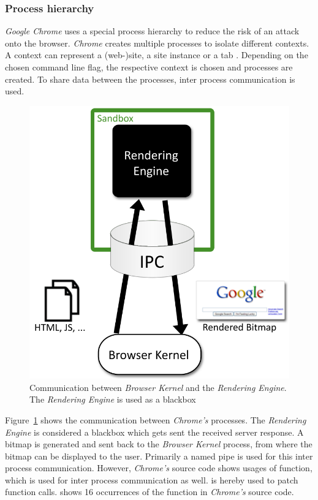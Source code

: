\subsubsection{Process hierarchy}
\emph{Google Chrome} uses a special process hierarchy to reduce the risk of an attack onto the browser. \emph{Chrome} creates multiple processes to isolate different contexts. A context can represent a (web-)site, a site instance or a tab \cite{chromium_process_models}. Depending on the chosen command line flag, the respective context is chosen and processes are created. To share data between the processes, inter process communication is used.
\begin{figure}[h]
\centering
\includegraphics[scale=0.5]{sections/background/chrome/communication.png}
\caption{Communication between \emph{Browser Kernel} and the \emph{Rendering Engine}. The \emph{Rendering Engine} is used as a blackbox \cite{chromium_security_architecture}}
\label{fig:chrome_communication}
\end{figure}
Figure~\ref{fig:chrome_communication} shows the communication between \emph{Chrome's} processes. The \emph{Rendering Engine} is considered a blackbox which gets sent the received server response. A bitmap is generated and sent back to the \emph{Browser Kernel} process, from where the bitmap can be displayed to the user. Primarily a named pipe \cite{chromium_security_architecture} is used for this inter process communication. However, \emph{Chrome's} source code shows usages of  function, which is used for inter process communication as well.  is hereby used to patch function calls. \cite{chromium_source_writeprocessmemory} shows 16 occurrences of the  function in \emph{Chrome's} source code.